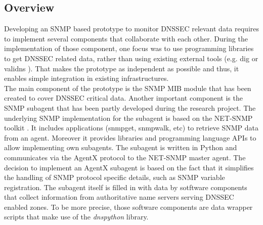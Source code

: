\subsection{Overview}
\label{section:overview}
Developing an SNMP based prototype to monitor DNSSEC relevant data requires to implement several components that collaborate with each other. During the implementation of those component, one focus was to use programming libraries to get DNSSEC related data, rather than using existing external tools (e.g. dig \cite{dig} or validns \cite{validns}). That makes the prototype as independent as possible and thus, it enables simple integration in existing infrastructures. 
\\
The main component of the prototype is the SNMP MIB module that has been created to cover DNSSEC critical data. Another important component is the SNMP subagent that has been partly developed during the research project. 
The underlying SNMP implementation for the subagent is based on the NET-SNMP toolkit \cite{net-snmp}. It includes applications (snmpget, snmpwalk, etc) to retrieve SNMP data from an agent. Moreover it provides libraries and programming language APIs to allow implementing own subagents. 
The subagent is written in Python and communicates via the AgentX \cite{agentx} protocol to the NET-SNMP master agent. The decision to implement an AgentX subagent is based on the fact that it simplifies the handling of SNMP protocol specific details, such as SNMP variable registration. The subagent itself is filled in with data by sotftware components that collect information from authoritative name servers serving DNSSEC enabled zones. To be more precise, those software components are data wrapper scripts that make use of the \textit{dnspython} \cite{dnspython} library.
